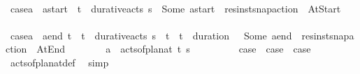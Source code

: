 \begin{isabellebody}
\ \ \ \ \ \ \isamarkupfalse%
\ {\isacharquery}{\kern0pt}case{}{\isacharequal}{\kern0pt}{\isachardoublequoteopen}a\ {\isasymin}\ {\isacharbraceleft}{\kern0pt}a\isactrlsub s\isactrlsub t\isactrlsub a\isactrlsub r\isactrlsub t{\isachardot}{\kern0pt}\ {\isasymexists}{\isasympi}{\isachardot}{\kern0pt}\ {\isacharparenleft}{\kern0pt}t{\isacharcomma}{\kern0pt}{\isasympi}{\isacharparenright}{\kern0pt}\ {\isasymin}\ durative{\isacharunderscore}{\kern0pt}acts\ {\isasympi}s\ {\isasymand}\ Some\ a\isactrlsub s\isactrlsub t\isactrlsub a\isactrlsub r\isactrlsub t\ {\isacharequal}{\kern0pt}\ res{\isacharunderscore}{\kern0pt}inst{\isacharunderscore}{\kern0pt}snap{\isacharunderscore}{\kern0pt}action\ {\isasympi}\ At{\isacharunderscore}{\kern0pt}Start{\isacharbraceright}{\kern0pt}{\isachardoublequoteclose}\isanewline
\ \ \ \ \ \ \isamarkupfalse%
\ {\isacharquery}{\kern0pt}case{}{\isacharequal}{\kern0pt}{\isachardoublequoteopen}a\ {\isasymin}\ {\isacharbraceleft}{\kern0pt}a\isactrlsub e\isactrlsub n\isactrlsub d{\isachardot}{\kern0pt}\ {\isasymexists}t{\isacharprime}{\kern0pt}\ {\isasympi}{\isachardot}{\kern0pt}\ {\isacharparenleft}{\kern0pt}t{\isacharprime}{\kern0pt}{\isacharcomma}{\kern0pt}{\isasympi}{\isacharparenright}{\kern0pt}\ {\isasymin}\ durative{\isacharunderscore}{\kern0pt}acts\ {\isasympi}s\ {\isasymand}\ t\ {\isacharequal}{\kern0pt}\ t{\isacharprime}{\kern0pt}\ {\isacharplus}{\kern0pt}\ duration\ {\isasympi}\ {\isasymand}\ Some\ a\isactrlsub e\isactrlsub n\isactrlsub d\ {\isacharequal}{\kern0pt}\ res{\isacharunderscore}{\kern0pt}inst{\isacharunderscore}{\kern0pt}snap{\isacharunderscore}{\kern0pt}action\ {\isasympi}\ At{\isacharunderscore}{\kern0pt}End{\isacharbraceright}{\kern0pt}{\isachardoublequoteclose}\isanewline
\ \ \ \ \ \ \isamarkupfalse%
\ {\isachardoublequoteopen}a\ {\isasymin}\ acts{\isacharunderscore}{\kern0pt}of{\isacharunderscore}{\kern0pt}plan{\isacharunderscore}{\kern0pt}at\ t\ {\isasympi}s{\isachardoublequoteclose}\isanewline
\ \ \ \ \ \ \isamarkupfalse%
\ \isamarkupfalse%
\ {\isachardoublequoteopen}{\isacharquery}{\kern0pt}case{}\ {\isasymor}\ {\isacharquery}{\kern0pt}case{}\ {\isasymor}\ {\isacharquery}{\kern0pt}case{}{\isachardoublequoteclose}\isanewline
\ \ \ \ \ \ \ \ \isamarkupfalse%
\ acts{\isacharunderscore}{\kern0pt}of{\isacharunderscore}{\kern0pt}plan{\isacharunderscore}{\kern0pt}at{\isacharunderscore}{\kern0pt}def\ \isamarkupfalse%
\ simp\isanewline

\end{isabellebody}
